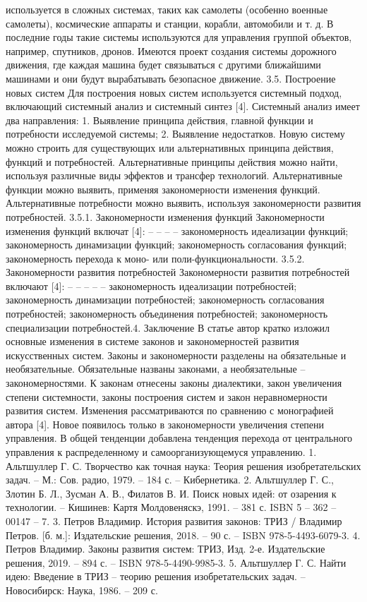 \documentclass[11pt,a4paper]{article}
\begin{document}
\begin{itemize}
используется в сложных системах, таких как самолеты (особенно военные самолеты),
космические аппараты и станции, корабли, автомобили и т. д.
В последние годы такие системы используются для управления группой объектов,
например, спутников, дронов. Имеются проект создания системы дорожного движения,
где каждая машина будет связываться с другими ближайшими машинами и они будут
вырабатывать безопасное движение.
3.5. Построение новых систем
Для построения новых систем используется системный подход, включающий
системный анализ и системный синтез [4].
Системный анализ имеет два направления:
1. Выявление принципа действия, главной функции и потребности исследуемой
системы;
2. Выявление недостатков.
Новую систему можно строить для существующих или альтернативных принципа
действия, функций и потребностей.
Альтернативные принципы действия можно найти, используя различные виды
эффектов и трансфер технологий. Альтернативные функции можно выявить, применяя
закономерности изменения функций. Альтернативные потребности можно выявить,
используя закономерности развития потребностей.
3.5.1. Закономерности изменения функций
Закономерности изменения функций включат [4]:
–
–
–
–
закономерность идеализации функций;
закономерность динамизации функций;
закономерность согласования функций;
закономерность перехода к моно- или поли-функциональности.
3.5.2. Закономерности развития потребностей
Закономерности развития потребностей включают [4]:
–
–
–
–
–
закономерность идеализации потребностей;
закономерность динамизации потребностей;
закономерность согласования потребностей;
закономерность объединения потребностей;
закономерность специализации потребностей.4. Заключение
В статье автор кратко изложил основные изменения в системе законов и
закономерностей развития искусственных систем.
Законы и закономерности разделены на обязательные и необязательные.
Обязательные названы законами, а необязательные – закономерностями.
К законам отнесены законы диалектики, закон увеличения степени системности,
законы построения систем и закон неравномерности развития систем.
Изменения рассматриваются по сравнению с монографией автора [4]. Новое
появилось только в закономерности увеличения степени управления. В общей тенденции
добавлена тенденция перехода от центрального управления к распределенному и
самоорганизующемуся управлению.
1. Альтшуллер Г. С. Творчество как точная наука: Теория решения
изобретательских задач. – М.: Сов. радио, 1979. – 184 с. – Кибернетика.
2. Альтшуллер Г. С., Злотин Б. Л., Зусман А. В., Филатов В. И. Поиск новых идей:
от озарения к технологии. – Кишинев: Картя Молдовеняскэ, 1991. – 381 с.
ISBN 5 – 362 – 00147 – 7.
3. Петров Владимир. История развития законов: ТРИЗ / Владимир Петров.
[б. м.]: Издательские решения, 2018. – 90 с. – ISBN 978-5-4493-6079-3.
4. Петров Владимир. Законы развития систем: ТРИЗ, Изд. 2-е. Издательские
решения, 2019. – 894 с. – ISBN 978-5-4490-9985-3.
5. Альтшуллер Г. С. Найти идею: Введение в ТРИЗ – теорию решения
изобретательских задач. – Новосибирск: Наука, 1986. – 209 с.


\end{itemize}
\end{document}

